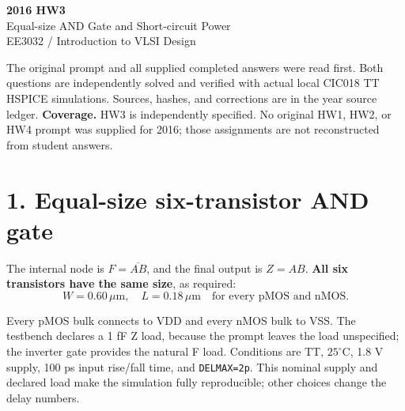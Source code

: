\documentclass[11pt,a4paper]{article}
\newcommand{\VDD}{V_{\mathrm{DD}}}
\newcommand{\VSS}{V_{\mathrm{SS}}}
\newcommand{\MOS}[5]{
  \coordinate (#1) at (#2,#3);
  \coordinate (#1t) at ($(#1)+(0,.55)$);
  \coordinate (#1b) at ($(#1)+(0,-.55)$);
  \draw (#1t)--($(#1)+(0,.30)$)--($(#1)+(-.18,.30)$);
  \draw ($(#1)+(-.18,.34)$)--($(#1)+(-.18,-.34)$);
  \draw ($(#1)+(-.18,-.30)$)--($(#1)+(0,-.30)$)--(#1b);
  \draw ($(#1)+(-.35,.33)$)--($(#1)+(-.35,-.33)$);
  \def\type{#5}\def\ptype{p}
  \ifx\type\ptype
    \draw ($(#1)+(-.78,0)$)--($(#1)+(-.53,0)$);
    \draw ($(#1)+(-.465,0)$) circle (.065);
    \draw ($(#1)+(-.40,0)$)--($(#1)+(-.35,0)$);
  \else
    \draw ($(#1)+(-.78,0)$)--($(#1)+(-.35,0)$);
  \fi
  \node[anchor=east] at ($(#1)+(-.82,0)$) {$#4$};
  \node[anchor=west,font=\scriptsize] at ($(#1)+(.10,0)$) {#1};
}
\begin{document}
\begin{center}{\LARGE\bfseries 2016 HW3}\\[4pt]{\large Equal-size AND Gate and Short-circuit Power}\\[4pt]{\small EE3032 / Introduction to VLSI Design}\end{center}
The original prompt and all supplied completed answers were read first. Both questions are independently solved and verified with actual local CIC018 TT HSPICE simulations. Sources, hashes, and corrections are in the year source ledger.
\textbf{Coverage.} HW3 is independently specified. No original HW1, HW2, or HW4 prompt was supplied for 2016; those assignments are not reconstructed from student answers.

\section*{1. Equal-size six-transistor AND gate}
The internal node is $F=\overline{AB}$, and the final output is $Z=AB$. \textbf{All six transistors have the same size}, as required:
\[
 \boxed{W=0.60\,\mu\mathrm m,\quad L=0.18\,\mu\mathrm m\quad\text{for every pMOS and nMOS}.}
\]
\begin{center}\end{center}
Every pMOS bulk connects to VDD and every nMOS bulk to VSS. The testbench declares a 1 fF Z load, because the prompt leaves the load unspecified; the inverter gate provides the natural F load. Conditions are TT, $25^\circ$C, 1.8 V supply, 100 ps input rise/fall time, and \texttt{DELMAX=2p}. This nominal supply and declared load make the simulation fully reproducible; other choices change the delay numbers.
\end{document}
